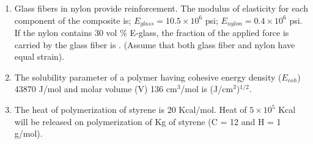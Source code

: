\documentclass[a4paper,10pt]{article}
\begin{document}
\begin{enumerate}
    \item Glass fibers in nylon provide reinforcement. The modulus of elasticity for each component of the composite is; $E_{glass} = 10.5 \times 10^6$ psi; $E_{nylon} = 0.4 \times 10^6$ psi. If the nylon contains 30 vol \% E-glass, the fraction of the applied force is carried by the glass fiber is \underline{\hspace{2cm}}. (Assume that both glass fiber and nylon have equal strain).
    \hfill{}

    \item The solubility parameter of a polymer having cohesive energy density ($E_{coh}$) 43870 J/mol and molar volume (V) 136 cm$^3$/mol is \underline{\hspace{2cm}} (J/cm$^3$)$^{1/2}$.
    \hfill{}

    \item The heat of polymerization of styrene is 20 Kcal/mol. Heat of $5 \times 10^5$ Kcal will be released on polymerization of \underline{\hspace{2cm}} Kg of styrene (C = 12 and H = 1 g/mol).
    \hfill{}
\end{enumerate}
\clearpage
\end{document}
